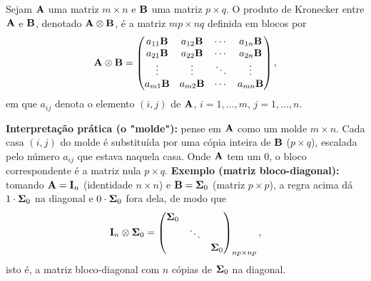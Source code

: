 \begin{definition}
	Sejam $\mathbf{A}$ uma matriz $m \times n$ e $\mathbf{B}$ uma matriz $p \times q$. O produto de Kronecker entre $\mathbf{A}$ e $\mathbf{B}$, denotado $\mathbf{A} \otimes \mathbf{B}$, é a matriz $mp \times nq$ definida em blocos por
	\[
	\mathbf{A} \otimes \mathbf{B} =
	\begin{pmatrix}
		a_{11}\mathbf{B} & a_{12}\mathbf{B} & \cdots & a_{1n}\mathbf{B} \\
		a_{21}\mathbf{B} & a_{22}\mathbf{B} & \cdots & a_{2n}\mathbf{B} \\
		\vdots & \vdots & \ddots & \vdots \\
		a_{m1}\mathbf{B} & a_{m2}\mathbf{B} & \cdots & a_{mn}\mathbf{B}
	\end{pmatrix},
	\]
	em que $a_{ij}$ denota o elemento $(i,j)$ de $\mathbf{A}$, $i=1,\ldots,m$, $j=1,\ldots,n$.
	\begin{note}
		\leavevmode
		\begin{outline}[enumerate]
			\1 \textbf{Interpretação prática (o "molde"):} pense em $\mathbf{A}$ como um molde $m \times n$. Cada casa $(i,j)$ do molde é substituída por uma cópia inteira de $\mathbf{B}$ ($p\times q$), escalada pelo número $a_{ij}$ que estava naquela casa. Onde $\mathbf{A}$ tem um $0$, o bloco correspondente é a matriz nula $p\times q$.
			\1 \textbf{Exemplo (matriz bloco-diagonal):} tomando $\mathbf{A} = \mathbf{I}_n$ (identidade $n\times n$) e $\mathbf{B} = \mathbf{\Sigma}_0$ (matriz $p \times p$), a regra acima dá $1\cdot\mathbf{\Sigma}_0$ na diagonal e $0\cdot\mathbf{\Sigma}_0$ fora dela, de modo que
			\[
			\mathbf{I}_n \otimes \mathbf{\Sigma}_0 =
			\begin{pmatrix}
				\mathbf{\Sigma}_0 & & \\
				& \ddots & \\
				& & \mathbf{\Sigma}_0
			\end{pmatrix}_{np \times np},
			\]
			isto é, a matriz bloco-diagonal com $n$ cópias de $\mathbf{\Sigma}_0$ na diagonal.
		\end{outline}
	\end{note}
\end{definition}

